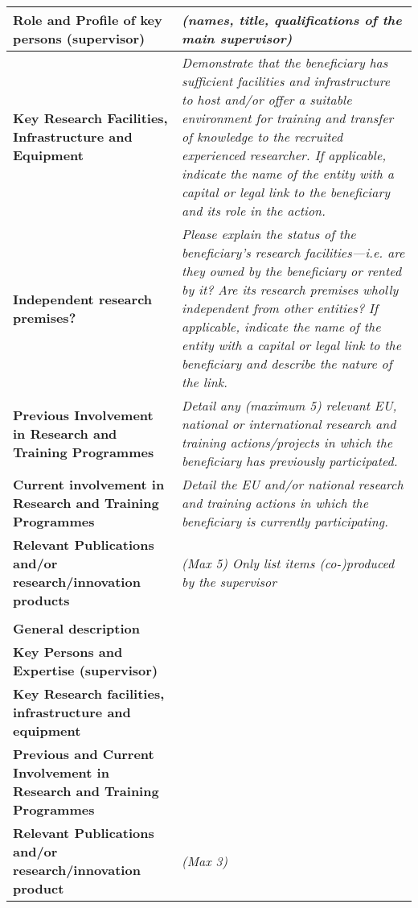 \begin{table}[h!]
{\begin{tabular}{|>{\raggedright}p{}|p{}|}
\\\hline
\textbf{Role and Profile of key persons (supervisor)} &
{\em (names, title, qualifications of the main supervisor)}
{\em }
\\\hline
\textbf{Key Research Facilities, Infrastructure and Equipment} &
{\em Demonstrate that the beneficiary has sufficient facilities and infrastructure to host and/or offer a suitable environment for training and transfer of knowledge to the recruited experienced researcher.
\newline
If applicable, indicate the name of the entity with a capital or
legal link to the beneficiary and its role in the action.
}
\\\hline
\textbf{Independent research premises?} &
{\em Please explain the status of the beneficiary's research facilities\----i.e. are they owned by the beneficiary or rented by it? Are its research premises wholly independent from other entities?
\newline
If applicable, indicate the name of the entity with a capital or
legal link to the beneficiary and describe the nature of the
link.
}
\\\hline
\textbf{Previous Involvement in Research and Training Programmes} &
{\em Detail any (maximum 5) relevant EU, national or international research and training actions/projects in which the beneficiary has previously participated.}
\\\hline
\textbf{Current involvement in Research and Training Programmes} &
{\em Detail the EU and/or national research and training actions in which the beneficiary is currently participating.}
\\\hline
\textbf{Relevant Publications and/or research/innovation products} &
{\em (Max 5) Only list items (co-)produced by the supervisor}
\\\hline
  \multicolumn{2}{|l|}{\cellcolor{gray!50}\textbf{Partner Organisation Y}} \\\hline
\textbf{General description} &
\\\hline
\textbf{Key Persons and Expertise (supervisor)} &
\\\hline
\textbf{Key Research facilities, infrastructure and equipment} &
\\\hline
\textbf{Previous and Current Involvement in Research and Training Programmes} &
\\\hline
\textbf{Relevant Publications and/or research/innovation product} &
{\em (Max 3)}
\\\hline
\end{tabular}}
\end{table}




